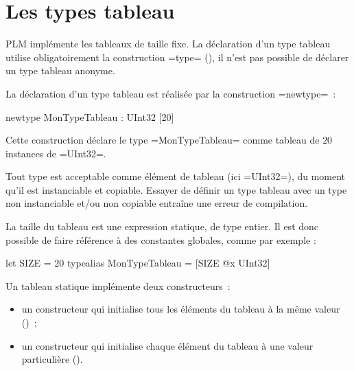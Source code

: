 




\chapter{Les types tableau}

PLM implémente les tableaux de taille fixe. La déclaration d'un type tableau utilise obligatoirement la construction \plm=type= (), il n'est pas possible de déclarer un type tableau anonyme.









La déclaration d'un type tableau est réalisée par la construction \plm=newtype=~:

\begin{PLM}
newtype MonTypeTableau : UInt32 [20]
\end{PLM}

Cette construction déclare le type \plm=MonTypeTableau= comme tableau de $20$ instances de \plm=UInt32=.

Tout type est acceptable comme élément de tableau (ici \plm=UInt32=), du moment qu'il est instanciable et copiable. Essayer de définir un type tableau avec un type non instanciable et/ou non copiable entraîne une erreur de compilation.

La taille du tableau est une expression statique, de type entier. Il est donc possible de faire référence à des constantes globales, comme par exemple :

\begin{PLM}
let SIZE = 20
typealias MonTypeTableau = [SIZE @x UInt32]
\end{PLM}



Un tableau statique implémente deux constructeurs~:
\begin{itemize}
  \item un constructeur qui initialise tous les éléments du tableau à la même valeur ()~;
  \item un constructeur qui initialise chaque élément du tableau à une valeur particulière ().
\end{itemize}





